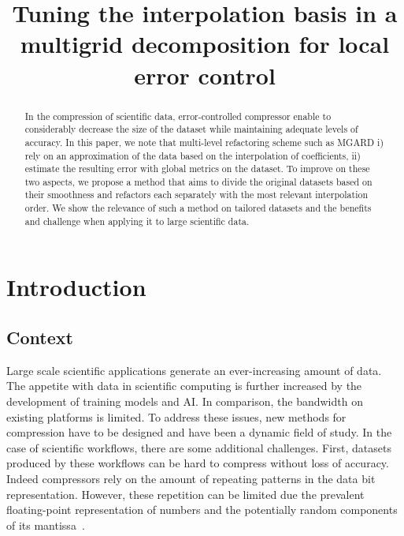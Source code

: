 \documentclass[conference]{IEEEtran}
\title{Tuning the interpolation basis in a multigrid decomposition for local error control}
\author{\IEEEauthorblockN{Nicolas Vidal}
\IEEEauthorblockA{Oak Ridge National Laboratory}
\and
\IEEEauthorblockN{Qian Gong}
\IEEEauthorblockA{Oak Ridge National Laboratory}
\and
\IEEEauthorblockN{Viktor Reshniak}
\IEEEauthorblockA{Oak Ridge National Laboratory}
\and
\IEEEauthorblockN{Rick Archibald}
\IEEEauthorblockA{Oak Ridge National Laboratory}
\and
\IEEEauthorblockN{Scott Klasky}
\IEEEauthorblockA{Oak Ridge National Laboratory}}
\date{}
\theoremstyle{remark}
\begin{document}
\maketitle



\begin{abstract}
In the compression of scientific data, error-controlled compressor enable to considerably decrease the size of the dataset while maintaining adequate levels of accuracy.
In this paper, we note that multi-level refactoring scheme such as MGARD i) rely on an approximation of the data based on the interpolation of coefficients, ii) estimate the resulting error with global metrics on the dataset.
To improve on these two aspects, we propose a method that aims to divide the original datasets based on their smoothness and refactors each separately with the most relevant interpolation order. We show the relevance of such a method on tailored datasets and the benefits and challenge when applying it to large scientific data.
\end{abstract}

\section{Introduction}
\subsection{Context}
Large scale scientific applications generate an ever-increasing amount of data. %
The appetite with data in scientific computing is further increased by the development of training models and AI.
In comparison, the bandwidth on existing platforms is limited.
To address these issues, new methods for compression have to be designed and have been a dynamic field of study.
In the case of scientific workflows, there are some additional challenges.
First, datasets produced by these workflows can be hard to compress without loss of accuracy. Indeed compressors rely on the amount of repeating patterns in the data bit representation. However, these repetition can be limited due the prevalent floating-point representation of numbers and the potentially random components of its mantissa~\cite{lakshminarasimhan2013isabela,sayood2017introduction}. %
\end{document}
